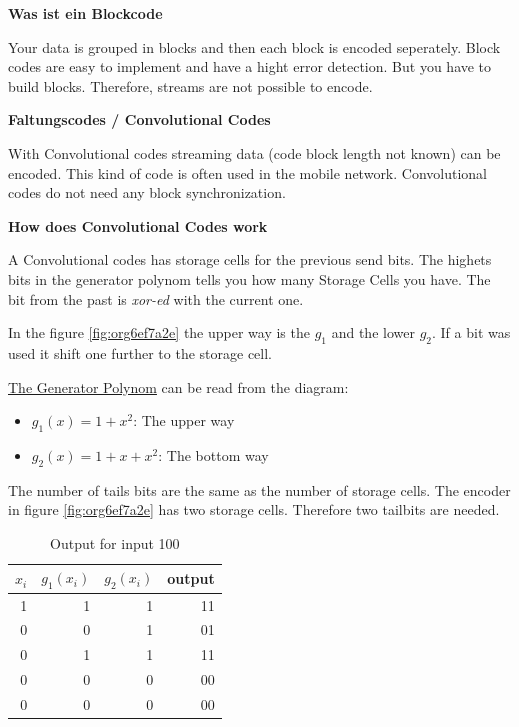 \documentclass[11pt,twoside,twocolumn,landscape]{article}
\begin{document}
\textbf{Was ist ein Blockcode}

Your data is grouped in blocks and then each block is encoded seperately.
Block codes are easy to implement and have a hight error detection.
But you have to build blocks.
Therefore, streams are not possible to encode.

\textbf{Faltungscodes / Convolutional Codes}

With Convolutional codes streaming data (code block length not known) can be encoded.
This kind of code is often used in the mobile network.
Convolutional codes do not need any block synchronization.

\textbf{How does Convolutional Codes work}

A Convolutional codes has storage cells for the previous send bits.
The highets bits in the generator polynom tells you how many Storage Cells you have.
The bit from the past is \emph{xor-ed} with the current one.

In the figure \ref{fig:org6ef7a2e}  the upper way is the \(g_1\) and the lower \(g_2\).
If a bit was used it shift one further to the storage cell.

\href{../../../roam/20211105145648-the_generator_polynom_for_hamming_codes.org}{The Generator Polynom} can be read from the diagram:
\begin{itemize}
\item \(g_1(x) = 1 + x^2\): The upper way
\item \(g_2(x) = 1 + x + x^2\): The bottom way
\end{itemize}


The number of tails bits are the same as the number of storage cells.
The encoder in figure \ref{fig:org6ef7a2e} has two storage cells.
Therefore two tailbits are needed.


\begin{table}[htbp]
\caption{\label{tab:org3a3fb35}Output for input 100}
\centering
\begin{tabular}{rrrr}
\(x_i\) & \(g_1(x_i)\) & \(g_2(x_i)\) & output\\
\hline
1 & 1 & 1 & 11\\
0 & 0 & 1 & 01\\
0 & 1 & 1 & 11\\
0 & 0 & 0 & 00\\
0 & 0 & 0 & 00\\
\end{tabular}
\end{table}
\end{document}
